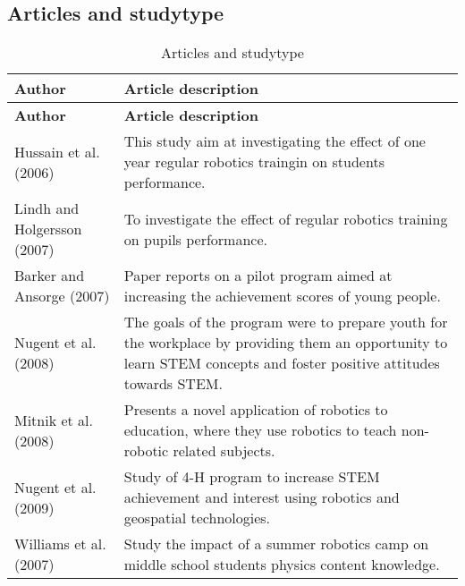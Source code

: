 \subsection*{Articles and studytype}
\setlength\LTleft{0px}
\setlength\LTright{0px}
\begin{longtable}{@{\extracolsep{\fill}}p{}p{}}
	\hline \multicolumn{1}{l}{\textbf{Author}} & \multicolumn{1}{l}{\textbf{Article description}} \\ \hline\hline
	\endfirsthead
	\hline\multicolumn{1}{l}{\textbf{Author}} & \multicolumn{1}{l}{\textbf{Article description}} \\ \hline\hline
	\endhead
	\hline \caption{Articles and studytype}\endlastfoot
	Hussain et al. (2006)\cite{hussain2006effect} & This study aim at investigating the effect of one year regular robotics traingin on students performance. \\\hline
	Lindh and Holgersson (2007)\cite{lindh2007does} & To investigate the effect of regular robotics training on pupils performance. \\\hline
	Barker and Ansorge (2007)\cite{barker2007robotics}& Paper reports on a pilot program aimed at increasing the achievement scores of young people. \\\hline
	Nugent et al. (2008)\cite{nugent2009use} & The goals of the program were to prepare youth for the workplace by providing them an opportunity to learn STEM concepts and foster positive attitudes towards STEM. \\\hline
	Mitnik et al. (2008)\cite{mitnik2008autonomous} & Presents a novel application of robotics to education, where they use robotics to teach non-robotic related subjects. \\\hline
	Nugent et al. (2009)\cite{nugent2008effect} & Study of 4-H program to increase STEM achievement and interest using robotics and geospatial technologies. \\\hline
	Williams et al. (2007)\cite{williams2007acquisition} & Study the impact of a summer robotics camp on middle school students physics content knowledge. \\\hline
\end{longtable}
